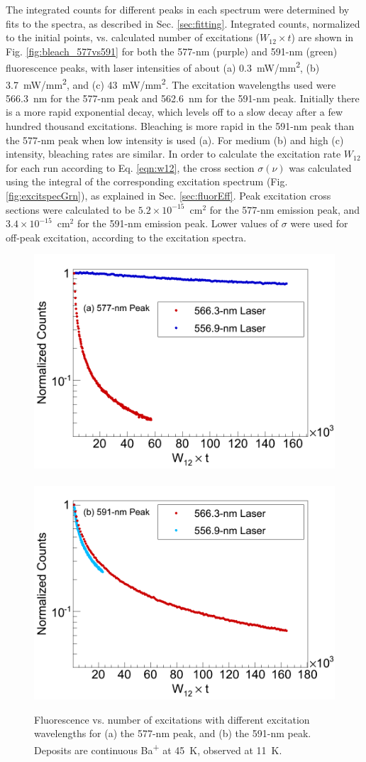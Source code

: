 The integrated counts for different peaks in each spectrum were determined by fits to the spectra, as described in Sec. \ref{sec:fitting}.  Integrated counts, normalized to the initial points, vs. calculated number of excitations ($W_{12} \times t$) are shown in Fig. \ref{fig:bleach_577vs591} for both the 577-nm (purple) and 591-nm (green) fluorescence peaks, with laser intensities of about (a) 0.3~mW/mm\textsuperscript{2}, (b) 3.7~mW/mm\textsuperscript{2}, and (c) 43~mW/mm\textsuperscript{2}.  The excitation wavelengths used were 566.3~nm for the 577-nm peak and 562.6~nm for the 591-nm peak.  Initially there is a more rapid exponential decay, which levels off to a slow decay after a few hundred thousand excitations.  Bleaching is more rapid in the 591-nm peak than the 577-nm peak when low intensity is used (a).  For medium (b) and high (c) intensity, bleaching rates are similar.  In order to calculate the excitation rate $W_{12}$ for each run according to Eq. \ref{eqn:w12}, the cross section $\sigma(\nu)$ was calculated using the integral of the corresponding excitation spectrum (Fig. \ref{fig:excitspecGrn}), as explained in Sec. \ref{sec:fluorEff}.  Peak excitation cross sections were calculated to be $5.2 \times 10^{-15}$~cm$^{2}$ for the 577-nm emission peak, and $3.4 \times 10^{-15}$~cm$^{2}$ for the 591-nm emission peak.  Lower values of $\sigma$ were used for off-peak excitation, according to the excitation spectra.

\begin{figure} %
        \centering
                \includegraphics[width=.5\textwidth]{figures/bleach_compareExcitations_specificSigmas_a.png}
                ~
                \includegraphics[width=.5\textwidth]{figures/bleach_compareExcitations_specificSigmas_b.png}
                \caption{Fluorescence vs. number of excitations with different excitation wavelengths for (a) the 577-nm peak, and (b) the 591-nm peak.  Deposits are continuous Ba\textsuperscript{+} at 45~K, observed at 11~K.}
\label{fig:bleach_excitCompare}
\end{figure}

